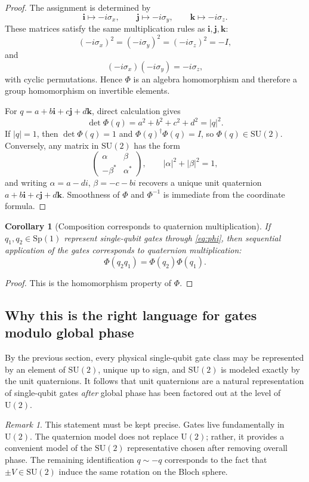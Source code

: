\documentclass[11pt]{article}
\newtheorem{corollary}[definition]{Corollary}
\theoremstyle{remark}
\newtheorem{remark}[definition]{Remark}
\newcommand{\SU}{\mathrm{SU}}
\newcommand{\U}{\mathrm{U}}
\newcommand{\Sp}{\mathrm{Sp}}
\newcommand{\ii}{\mathbf{i}}
\newcommand{\jj}{\mathbf{j}}
\newcommand{\kk}{\mathbf{k}}
\newcommand{\adjoint}{^\dagger}
\newcommand{\Id}{I}
\newcommand{\abs}[1]{\left\lvert #1 \right\rvert}
\begin{document}
\begin{proof}
The assignment is determined by
\[
\ii\mapsto -i\sigma_x,\qquad
\jj\mapsto -i\sigma_y,\qquad
\kk\mapsto -i\sigma_z.
\]
These matrices satisfy the same multiplication rules as $\ii,\jj,\kk$:
\[
(-i\sigma_x)^2=(-i\sigma_y)^2=(-i\sigma_z)^2=-\Id,
\]
and
\[
(-i\sigma_x)(-i\sigma_y)=-i\sigma_z,
\]
with cyclic permutations. Hence $\Phi$ is an algebra homomorphism and therefore a group homomorphism on invertible elements.

For $q=a+b\ii+c\jj+d\kk$, direct calculation gives
\[
\det \Phi(q)=a^2+b^2+c^2+d^2=\abs{q}^2.
\]
If $\abs{q}=1$, then $\det\Phi(q)=1$ and $\Phi(q)\adjoint\Phi(q)=\Id$, so $\Phi(q)\in\SU(2)$. Conversely, any matrix in $\SU(2)$ has the form
\[
\begin{pmatrix}
\alpha & \beta\\
-\beta^\ast & \alpha^\ast
\end{pmatrix},
\qquad \abs{\alpha}^2+\abs{\beta}^2=1,
\]
and writing $\alpha=a-di$, $\beta=-c-bi$ recovers a unique unit quaternion $a+b\ii+c\jj+d\kk$. Smoothness of $\Phi$ and $\Phi^{-1}$ is immediate from the coordinate formula.
\end{proof}

\begin{corollary}[Composition corresponds to quaternion multiplication]
If $q_1,q_2\in\Sp(1)$ represent single-qubit gates through \eqref{eq:phi}, then sequential application of the gates corresponds to quaternion multiplication:
\[
\Phi(q_2q_1)=\Phi(q_2)\Phi(q_1).
\]
\end{corollary}

\begin{proof}
This is the homomorphism property of $\Phi$.
\end{proof}

\subsection{Why this is the right language for gates modulo global phase}

By the previous section, every physical single-qubit gate class may be represented by an element of $\SU(2)$, unique up to sign, and $\SU(2)$ is modeled exactly by the unit quaternions. It follows that unit quaternions are a natural representation of single-qubit gates \emph{after} global phase has been factored out at the level of $\U(2)$.

\begin{remark}
This statement must be kept precise. Gates live fundamentally in $\U(2)$. The quaternion model does not replace $\U(2)$; rather, it provides a convenient model of the $\SU(2)$ representative chosen after removing overall phase. The remaining identification $q\sim -q$ corresponds to the fact that $\pm V\in\SU(2)$ induce the same rotation on the Bloch sphere.
\end{remark}
\end{document}
